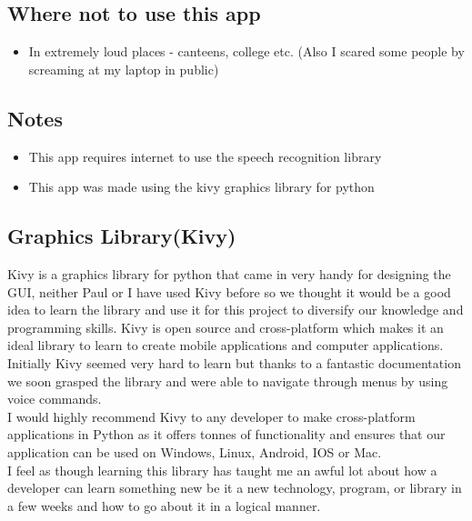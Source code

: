 \documentclass{article}
\begin{document}
\subsection{Where not to use this app}
\begin{itemize}
    \item     In extremely loud places - canteens, college etc. (Also I scared some people by screaming at my laptop in public)
\end{itemize}


\subsection{Notes}
\begin{itemize}
    \item  This app requires internet to use the speech recognition library
    \item This app was made using the kivy graphics library for python
\end{itemize}
\subsection{Graphics Library(Kivy)}
Kivy is a graphics library for python\cite{kivy} that came in very handy for designing the GUI, neither Paul or I have used Kivy before so we thought it would be a good idea to learn the library and use it for this project to diversify our knowledge and programming skills.  Kivy is open source and cross-platform which makes it an ideal library to learn to create mobile applications and computer applications. 
\\
Initially Kivy seemed very hard to learn but thanks to a fantastic documentation \cite{kivydocs} we soon grasped the library and were able to navigate through menus by using voice commands. 
\\
I would highly recommend Kivy to any developer to make cross-platform applications in Python as it offers tonnes of functionality and ensures that our application can be used on Windows, Linux, Android, IOS or Mac.
\\
I feel as though learning this library has taught me an awful lot about how a developer can learn something new be it a new technology, program, or library in a few weeks and how to go about it in a logical manner.
\end{document}
